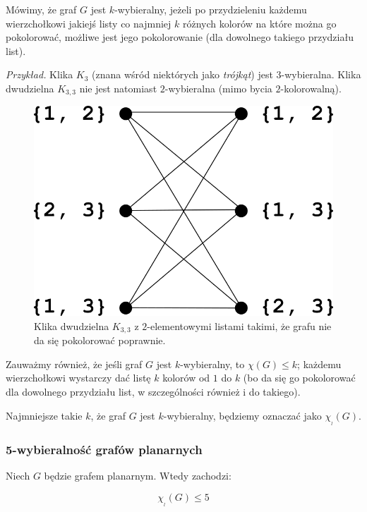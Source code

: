 Mówimy, że graf $G$ jest $k$-wybieralny, jeżeli po przydzieleniu każdemu wierzchołkowi jakiejś listy co najmniej $k$ różnych kolorów na które można go pokolorować, możliwe jest jego pokolorowanie (dla dowolnego takiego przydziału list).

\textit{Przykład.} Klika $K_3$ (znana wśród niektórych jako \textit{trójkąt}) jest 3-wybieralna. Klika dwudzielna $K_{3,3}$ nie jest natomiast $2$-wybieralna (mimo bycia $2$-kolorowalną).

\begin{figure}[H]
	\centering
	\includegraphics[scale=0.8]{images/K33.png}
	\caption{Klika dwudzielna $K_{3,3}$ z $2$-elementowymi listami takimi, że grafu nie da się pokolorować poprawnie.}
\end{figure}

Zauważmy również, że jeśli graf $G$ jest $k$-wybieralny, to $\chi(G) \leq k$; każdemu wierzchołkowi wystarczy dać listę $k$ kolorów od $1$ do $k$ (bo da się go pokolorować dla dowolnego przydziału list, w szczególności również i do takiego).

Najmniejsze takie $k$, że graf $G$ jest $k$-wybieralny, będziemy oznaczać jako $\chi_{_l}(G)$.

\subsubsection{5-wybieralność grafów planarnych}
Niech $G$ będzie grafem planarnym. Wtedy zachodzi:
\begin{theorem}{
		\begin{equation}
			\chi_{_l}(G) \leq 5
		\end{equation}
	}
\end{theorem}

